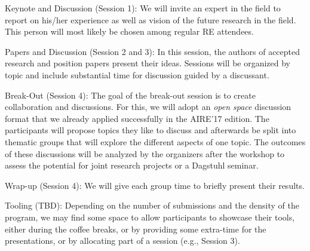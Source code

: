 \documentclass[conference,9pt]{IEEEtran}
\begin{document}
\begin{LaTeXdescription}
\item[Keynote and Discussion (Session 1):] We will invite an expert in the field to report on his/her experience as well as vision of the future research in the field. This person will most likely be chosen among regular RE attendees.
\item[Papers and Discussion (Session 2 and 3):] In this session, the authors of accepted research and position papers present their ideas. Sessions will be organized by topic and include substantial time for discussion guided by a discussant.

\item[Break-Out (Session 4):] 
The goal of the break-out session is to create collaboration and discussions. For this, we will adopt an \emph{open space} discussion format that we already applied successfully in the AIRE'17 edition. The participants will propose topics they like to discuss and afterwards be split into thematic groups that will explore the different aspects of one topic. The outcomes of these discussions will be analyzed by the organizers after the workshop to assess the potential for joint research projects or a Dagstuhl seminar.

\item[Wrap-up (Session 4):] We will give each group time to briefly present their results. 
\item[Tooling (TBD):] Depending on the number of submissions and the density of the program, we may find some space to allow participants to showcase their tools, either during the coffee breaks, or by providing some extra-time for the presentations, or by allocating part of a session (e.g., Session 3).
\end{LaTeXdescription}



\end{document}
